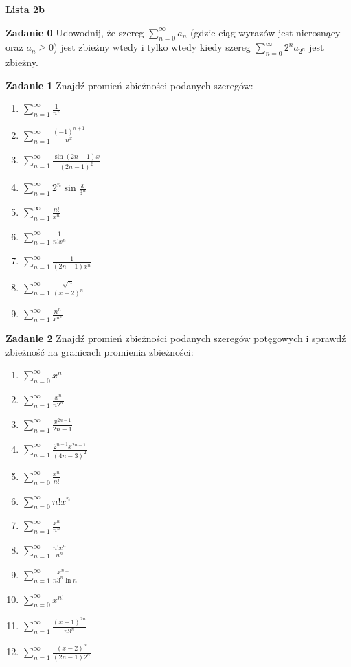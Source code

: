\documentclass[a4paper,11pt]{article}
\begin{document}
\begin{center}
  {\large\textbf{Lista 2b}}
\end{center}

\textbf{Zadanie 0} Udowodnij, że szereg $\sum_{n=0}^\infty a_n$ 
(gdzie ciąg wyrazów jest nierosnący oraz $a_n \geq 0$) jest zbieżny 
wtedy i tylko wtedy kiedy szereg $\sum_{n=0}^\infty 2^n a_{2^n}$ jest zbieżny.

\bigskip

\textbf{Zadanie 1} Znajdź promień zbieżności podanych szeregów:

\begin{multicols}{3}
    \begin{enumerate}
        \item $\sum_{n=1}^\infty \frac{1}{n^x}$
        \item $\sum_{n=1}^\infty \frac{(-1)^{n+1}}{n^x}$
        \item $\sum_{n=1}^\infty \frac{\sin(2n-1) x}{(2n-1)^2}$
        \item $\sum_{n=1}^\infty 2^n \sin \frac{x}{3^n}$
        \item $\sum_{n=1}^\infty \frac{n!}{x^n}$
        \item $\sum_{n=1}^\infty \frac{1}{n! x^n}$
        \item $\sum_{n=1}^\infty \frac{1}{(2n-1)x^n}$
        \item $\sum_{n=1}^\infty \frac{\sqrt{n}}{(x-2)^n}$
        \item $\sum_{n=1}^\infty \frac{n^n}{x^{n^n}}$
    \end{enumerate}
\end{multicols}

\bigskip

\textbf{Zadanie 2} Znajdź promień zbieżności podanych szeregów potęgowych i 
sprawdź zbieżność na granicach promienia zbieżności:

\begin{multicols}{3}
    \begin{enumerate}
        \item $\sum_{n=0}^\infty x^n$
        \item $\sum_{n=1}^\infty \frac{x^n}{n 2^n}$
        \item $\sum_{n=1}^\infty \frac{x^{2n-1}}{2n-1}$
        \item $\sum_{n=1}^\infty \frac{2^{n-1} x^{2n-1}}{(4n-3)^2}$
        \item $\sum_{n=0}^\infty \frac{x^n}{n!}$
        \item $\sum_{n=0}^\infty n! x^n$
        \item $\sum_{n=1}^\infty \frac{x^n}{n^n}$
        \item $\sum_{n=1}^\infty \frac{n! x^n}{n^n}$
        \item $\sum_{n=1}^\infty \frac{x^{n-1}}{n 3^n \ln n}$
        \item $\sum_{n=0}^\infty x^{n!}$
        \item $\sum_{n=1}^\infty \frac{(x-1)^{2n}}{n 9^n}$
        \item $\sum_{n=1}^\infty \frac{(x-2)^n}{(2n-1) 2^n}$
    \end{enumerate}
\end{multicols}
\end{document}
